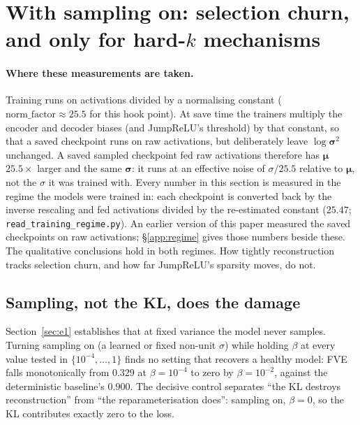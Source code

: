 \documentclass[11pt]{article}
\begin{document}
\section{With sampling on: selection churn, and only for hard-$k$ mechanisms}
\label{sec:mechanism}

\paragraph{Where these measurements are taken.} Training runs on activations
divided by a normalising constant ($\mathrm{norm\_factor}\approx25.5$ for this
hook point). At save time the trainers multiply the encoder and decoder biases
(and JumpReLU's threshold) by that constant, so that a saved checkpoint runs
on raw activations, but deliberately leave $\log\boldsymbol{\sigma}^2$
unchanged. A saved sampled checkpoint fed raw activations therefore has
$\boldsymbol{\mu}$ $25.5\times$ larger and the same $\boldsymbol{\sigma}$: it
runs at an effective noise of $\sigma/25.5$ relative to $\boldsymbol{\mu}$,
not the $\sigma$ it was trained with. Every number in this section is measured
in the regime the models were trained in: each checkpoint is converted back by
the inverse rescaling and fed activations divided by the re-estimated
constant ($25.47$; \texttt{read\_training\_regime.py}). An earlier version of
this paper measured the saved checkpoints on raw activations;
\S\ref{app:regime} gives those numbers beside these. The qualitative
conclusions hold in both regimes. How tightly reconstruction tracks selection
churn, and how far JumpReLU's sparsity moves, do not.

\subsection{Sampling, not the KL, does the damage}

Section~\ref{sec:e1} establishes that at fixed variance the model never
samples. Turning sampling on (a learned or fixed non-unit $\sigma$) while
holding $\beta$ at every value tested in $\{10^{-4},\ldots,1\}$ finds no
setting that recovers a healthy model: FVE falls monotonically from $0.329$
at $\beta=10^{-4}$ to zero by $\beta=10^{-2}$, against the deterministic
baseline's $0.900$. The decisive control separates ``the KL destroys
reconstruction'' from ``the reparameterisation does'': sampling on,
$\beta=0$, so the KL contributes exactly zero to the loss.
\end{document}
